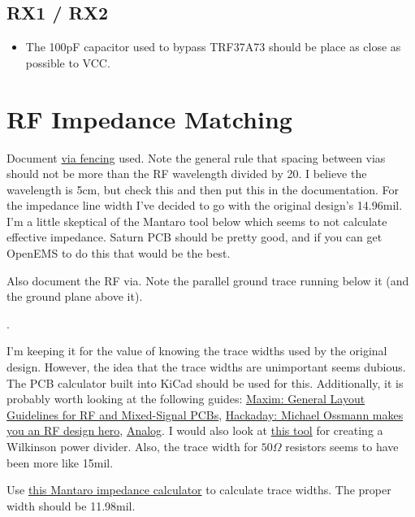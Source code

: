 \documentclass{default}
\begin{document}
\subsection{RX1 / RX2}

\begin{itemize}
\item The 100pF capacitor used to bypass TRF37A73 should be place as close as possible to VCC.
\end{itemize}

\section{RF Impedance Matching}

Document \href{https://en.wikipedia.org/wiki/Via_fence}{via fencing} used. Note the general rule
that spacing between vias should not be more than the RF wavelength divided by 20. I believe the
wavelength is 5cm, but check this and then put this in the documentation. For the impedance line
width I've decided to go with the original design's 14.96mil. I'm a little skeptical of the Mantaro
tool below which seems to not calculate effective impedance. Saturn PCB should be pretty good, and
if you can get OpenEMS to do this that would be the best.

Also document the RF via. Note the parallel ground trace running below it (and the ground plane
above it).

.

I'm keeping it for the value of knowing the trace widths used by the original design. However, the
idea that the trace widths are unimportant seems dubious. The PCB calculator built into KiCad should
be used for this. Additionally, it is probably worth looking at the following guides:
\href{https://www.maximintegrated.com/en/app-notes/index.mvp/id/5100#}{Maxim: General Layout
  Guidelines for RF and Mixed-Signal PCBs},
\href{https://hackaday.com/2016/03/23/michael-ossmann-makes-you-an-rf-design-hero/}{Hackaday:
  Michael Ossmann makes you an RF design hero},
\href{https://www.analog.com/media/en/training-seminars/design-handbooks/Basic-Linear-Design/Chapter12.pdf}{Analog}. I
would also look at \href{https://github.com/erichVK5/WilkinsonPowerDividerFootprintGenerator}{this
  tool} for creating a Wilkinson power divider. Also, the trace width for $50\si{\Omega}$ resistors
seems to have been more like 15mil.

Use \href{http://www.mantaro.com/resources/impedance-calculator.htm}{this Mantaro impedance
  calculator} to calculate trace widths. The proper width should be 11.98mil.
\end{document}
